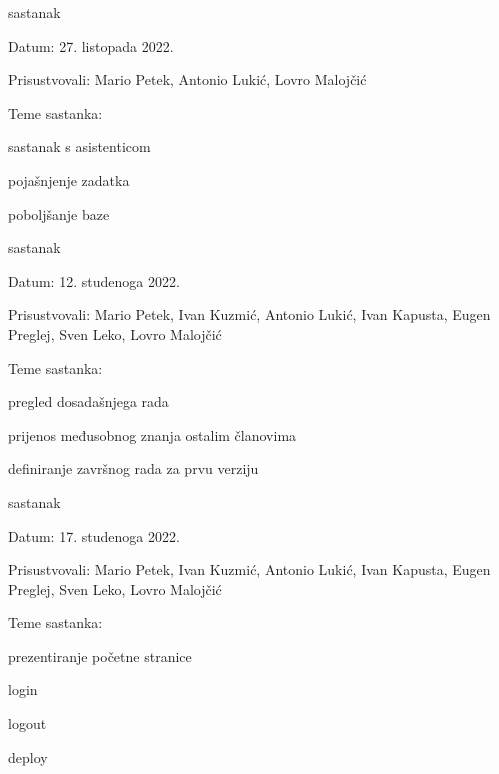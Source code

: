 \begin{packed_enum}
			\item  sastanak
			\item[] \begin{packed_item}
				\item Datum: 27. listopada 2022.
				\item Prisustvovali: Mario Petek, Antonio Lukić, Lovro Malojčić
				\item Teme sastanka:
				\begin{packed_item}
					\item  sastanak s asistenticom
					\item  pojašnjenje zadatka
					\item  poboljšanje baze
				\end{packed_item}
			\end{packed_item}
		
			\item  sastanak
			\item[] \begin{packed_item}
				\item Datum: 12. studenoga 2022.
				\item Prisustvovali: Mario Petek, Ivan Kuzmić, Antonio Lukić, Ivan Kapusta, Eugen Preglej, Sven Leko, Lovro Malojčić
				\item Teme sastanka:
				\begin{packed_item}
					\item  pregled dosadašnjega rada
					\item  prijenos međusobnog znanja ostalim članovima
					\item  definiranje završnog rada za prvu verziju
				\end{packed_item}
			\end{packed_item}
		
			\item  sastanak
			\item[] \begin{packed_item}
				\item Datum: 17. studenoga 2022.
				\item Prisustvovali: Mario Petek, Ivan Kuzmić, Antonio Lukić, Ivan Kapusta, Eugen Preglej, Sven Leko, Lovro Malojčić
				\item Teme sastanka: 
				\begin{packed_item}
					\item  prezentiranje početne stranice
					\item  login
					\item  logout
					\item  deploy
				\end{packed_item}
			\end{packed_item}
		

\end{packed_enum}
